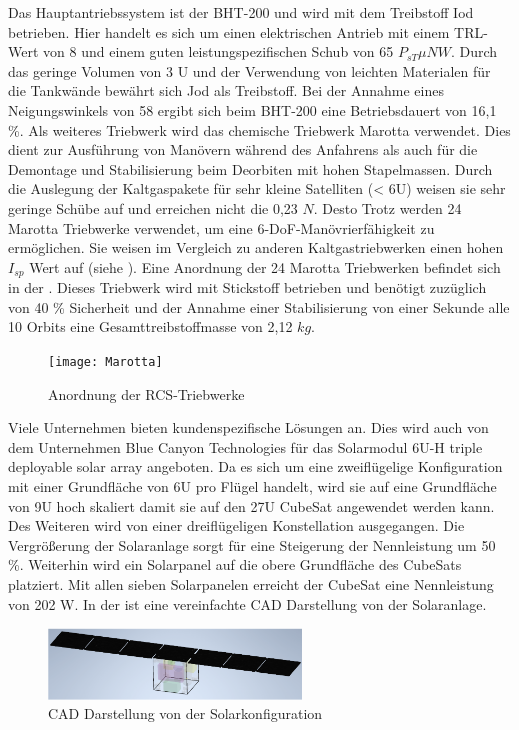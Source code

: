 	Das Hauptantriebssystem ist der BHT-200 und wird mit dem Treibstoff Iod betrieben. Hier handelt es sich um einen elektrischen Antrieb mit einem TRL-Wert von 8 und einem guten leistungspezifischen Schub von 65 $P_{sT} {\mu N}{W}$. Durch das geringe Volumen von 3 U und der Verwendung von leichten Materialen für die Tankwände bewährt sich Jod als Treibstoff. Bei der Annahme eines Neigungswinkels von 58 \textdegree ergibt sich beim BHT-200 eine Betriebsdauert von 16,1 \%. Als weiteres Triebwerk wird das chemische Triebwerk Marotta verwendet. Dies dient zur Ausführung von Manövern während des Anfahrens als auch für die Demontage und Stabilisierung beim Deorbiten mit hohen Stapelmassen. Durch die Auslegung der Kaltgaspakete für sehr kleine Satelliten (< 6U) weisen sie sehr geringe Schübe auf und erreichen nicht die 0,23 $N$. Desto Trotz werden 24 Marotta Triebwerke verwendet, um eine 6-DoF-Manövrierfähigkeit zu ermöglichen. Sie weisen im Vergleich zu anderen Kaltgastriebwerken einen hohen $I_{sp}$ Wert auf (siehe ). Eine Anordnung der 24 Marotta Triebwerken befindet sich in der . Dieses Triebwerk wird mit Stickstoff betrieben und benötigt zuzüglich von 40 \% Sicherheit und der Annahme einer Stabilisierung von einer Sekunde alle 10 Orbits  eine Gesamttreibstoffmasse von 2,12 $kg$.
\begin{figure}[!h]
\centering
	\texttt{[image: Marotta]}
	\caption{Anordnung der RCS-Triebwerke \cite{Lettau.}}
	\label{fig:marotta}
\end{figure}

	Viele Unternehmen bieten kundenspezifische Lösungen an. Dies wird auch von dem Unternehmen Blue Canyon Technologies für das Solarmodul 6U-H triple deployable solar array angeboten. Da es sich um eine zweiflügelige Konfiguration mit einer Grundfläche von 6U pro Flügel handelt, wird sie auf eine Grundfläche von 9U hoch skaliert damit sie auf  den 27U CubeSat angewendet werden kann. Des Weiteren wird von einer dreiflügeligen Konstellation ausgegangen. Die Vergrößerung der Solaranlage sorgt für eine Steigerung der Nennleistung um 50 \%. Weiterhin wird ein Solarpanel auf die obere Grundfläche des CubeSats platziert. Mit allen sieben Solarpanelen erreicht der CubeSat eine Nennleistung von 202 W. In der  ist eine vereinfachte CAD Darstellung von der Solaranlage. 
\begin{figure}[!h]
\centering
	\includegraphics[width=0.60\textwidth]{graphics/Solarpanel.PNG}
	\caption{CAD Darstellung von der Solarkonfiguration \cite{Lettau.}}
	\label{fig:solarpanel}
\end{figure}

